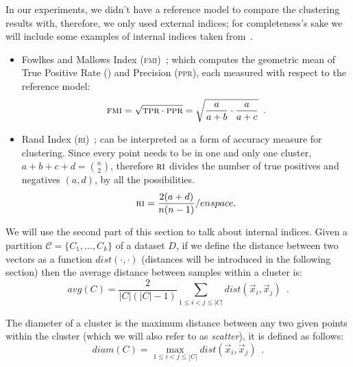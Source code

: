 In our experiments, we didn't have a reference model to compare the clustering results with,
therefore, we only used external indices; for completeness's sake we will include some examples of internal indices taken from~\cite{ZhouZhi-Hua2021ML}.

\begin{itemize}
	\item Fowlkes and Mallows Index (\textsc{fmi})~\cite{Fowlkes1983}; which computes the
		geometric mean of True Positive Rate (\tpr) and Precision (\textsc{ppr}), each
		measured with respect to the reference model:
		\begin{equation*}
			\textsc{fmi} = \sqrt{\textsc{tpr} \cdot \textsc{ppr}} = \sqrt{\frac{a}{a + b} \cdot
			\frac{a}{a + c}} \enspace.
		\end{equation*}
	\item Rand Index (\textsc{ri})~\cite{Rand1971}; can be interpreted as a form of accuracy
		measure for clustering. Since every point needs to be in one and only one cluster,
		$a + b + c + d = \binom{n}{2}$, therefore $\textsc{ri}$ divides the number of true
		positives and negatives $(a, d)$, by all the possibilities.
		\begin{equation*}
			\textsc{ri} = \frac{2(a + d)}{n(n - 1)} /enspace.
		\end{equation*}
\end{itemize}

We will use the second part of this section to talk about internal indices. Given a partition
$\mathcal{C} = \{C_1, \ldots, C_k\}$ of a dataset $D$, if we define the distance between two vectors
as a function $dist(\cdot, \cdot)$ (distances will be introduced in the following section) then the
average distance between samples within a cluster is:
\begin{equation}
	\label{eq:cluster-avg}
	avg(C) = \frac{2}{|C|(|C| - 1)}\sum_{1 \leq i < j \leq |C|} dist(\vec{x}_i, \vec{x}_j)
	\enspace.
\end{equation}

The diameter of a cluster is the maximum distance between any two given points within the cluster
(which we will also refer to as \emph{scatter}), it is defined as follows:
\begin{equation}
	\label{eq:cluster-diam}
	diam(C) = \max_{1 \leq i < j \leq |C|} dist(\vec{x}_i, \vec{x}_j) \enspace.
\end{equation}

